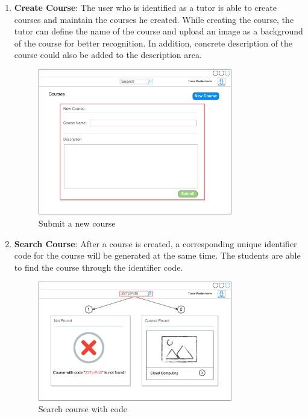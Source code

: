 \begin{enumerate}
\item
\textbf{Create Course}: The user who is identified as a tutor is able to create courses and maintain the courses he created. While creating the course, the tutor can define the name of the course and upload an image as a background of the course for better recognition. In addition, concrete description of the course could also be added to the description area.

\begin{figure}[!htbp]
  \centering
    \includegraphics[width=0.8\textwidth]{Figures/mockup/add-new-course.pdf}
  \caption{Submit a new course}
\end{figure}


\item
\textbf{Search Course}: After a course is created, a corresponding unique identifier code for the course will be generated at the same time. The students are able to find the course through the identifier code.

\begin{figure}[!htbp]
  \centering
    \includegraphics[width=0.8\textwidth]{Figures/mockup/Search-Course.pdf}
  \caption{Search course with code}
\end{figure}


\end{enumerate}
